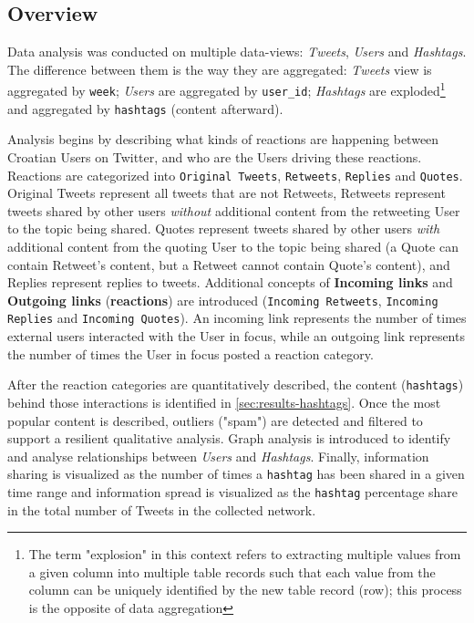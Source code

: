 \subsection{Overview}
\label{sec:results-overview}

Data analysis was conducted on multiple \glspl{data-view}: \textit{Tweets}, \textit{Users} and \textit{Hashtags}. The difference between them is the way they are aggregated: \textit{Tweets} view is aggregated by \texttt{week}; \textit{Users} are aggregated by \texttt{user\_id}; \textit{Hashtags} are exploded\footnote{The term "explosion" in this context refers to extracting multiple values from a given column into multiple table records such that each value from the column can be uniquely identified by the new table record (row); this process is the opposite of data aggregation} and aggregated by \texttt{hashtags} (content afterward).

Analysis begins by describing what kinds of reactions are happening between Croatian Users on Twitter, and who are the Users driving these reactions. Reactions are categorized into \texttt{Original Tweets}, \texttt{Retweets}, \texttt{Replies} and \texttt{Quotes}. Original Tweets represent all tweets that are not Retweets, Retweets represent tweets shared by other users \textit{without} additional content from the retweeting User to the topic being shared. Quotes represent tweets shared by other users \textit{with} additional content from the quoting User to the topic being shared (a Quote can contain Retweet's content, but a Retweet cannot contain Quote's content), and Replies represent replies to tweets. Additional concepts of \textbf{Incoming links} and \textbf{Outgoing links} (\textbf{reactions}) are introduced (\texttt{Incoming Retweets}, \texttt{Incoming Replies} and \texttt{Incoming Quotes}). An incoming link represents the number of times external users interacted with the User in focus, while an outgoing link represents the number of times the User in focus posted a reaction category.

After the reaction categories are quantitatively described, the content (\texttt{hashtags}) behind those interactions is identified in \ref{sec:results-hashtags}. Once the most popular content is described, outliers ("spam") are detected and filtered to support a resilient qualitative analysis. Graph analysis is introduced to identify and analyse relationships between \textit{Users} and \textit{Hashtags}. Finally, information sharing is visualized as the number of times a \texttt{hashtag} has been shared in a given time range and information spread is visualized as the \texttt{hashtag} percentage share in the total number of Tweets in the collected network.

